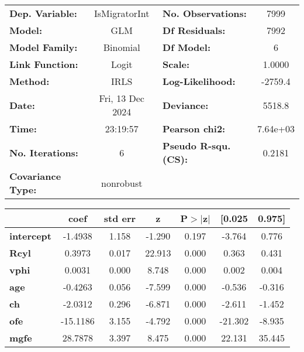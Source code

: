 \begin{center}
\begin{tabular}{lclc}
\toprule
\textbf{Dep. Variable:}   &  IsMigratorInt   & \textbf{  No. Observations:  } &     7999    \\
\textbf{Model:}           &       GLM        & \textbf{  Df Residuals:      } &     7992    \\
\textbf{Model Family:}    &     Binomial     & \textbf{  Df Model:          } &        6    \\
\textbf{Link Function:}   &      Logit       & \textbf{  Scale:             } &    1.0000   \\
\textbf{Method:}          &       IRLS       & \textbf{  Log-Likelihood:    } &   -2759.4   \\
\textbf{Date:}            & Fri, 13 Dec 2024 & \textbf{  Deviance:          } &    5518.8   \\
\textbf{Time:}            &     23:19:57     & \textbf{  Pearson chi2:      } &  7.64e+03   \\
\textbf{No. Iterations:}  &        6         & \textbf{  Pseudo R-squ. (CS):} &   0.2181    \\
\textbf{Covariance Type:} &    nonrobust     & \textbf{                     } &             \\
\bottomrule
\end{tabular}
\begin{tabular}{lcccccc}
                   & \textbf{coef} & \textbf{std err} & \textbf{z} & \textbf{P$> |$z$|$} & \textbf{[0.025} & \textbf{0.975]}  \\
\midrule
\textbf{intercept} &      -1.4938  &        1.158     &    -1.290  &         0.197        &       -3.764    &        0.776     \\
\textbf{Rcyl}      &       0.3973  &        0.017     &    22.913  &         0.000        &        0.363    &        0.431     \\
\textbf{vphi}      &       0.0031  &        0.000     &     8.748  &         0.000        &        0.002    &        0.004     \\
\textbf{age}       &      -0.4263  &        0.056     &    -7.599  &         0.000        &       -0.536    &       -0.316     \\
\textbf{ch}        &      -2.0312  &        0.296     &    -6.871  &         0.000        &       -2.611    &       -1.452     \\
\textbf{ofe}       &     -15.1186  &        3.155     &    -4.792  &         0.000        &      -21.302    &       -8.935     \\
\textbf{mgfe}      &      28.7878  &        3.397     &     8.475  &         0.000        &       22.131    &       35.445     \\
\bottomrule
\end{tabular}
\end{center}